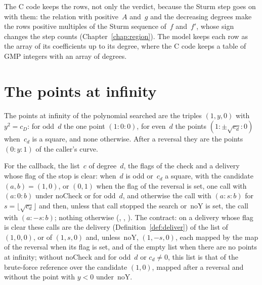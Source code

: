 The C code keeps the rows, not only the verdict, because the Sturm step goes on with them: the
relation with positive~$A$ and~$g$ and the decreasing degrees make the rows positive multiples of
the Sturm sequence of~$f$ and~$f'$, whose sign changes the step counts (Chapter~\ref{chap:region}).
The model keeps each row as the array of its coefficients up to its degree, where the C code keeps a
table of GMP integers with an array of degrees.

\section{The points at infinity}\label{sec:pointsAtInfinity}

The points at infinity of the polynomial searched are the triples $(1, y, 0)$ with $y^2 = c_D$: for
odd~$d$ the one point $(1 : 0 : 0)$, for even~$d$ the points $(1 : \pm\sqrt{c_d} : 0)$ when~$c_d$ is
a square, and none otherwise. After a reversal they are the points $(0 : y : 1)$ of the caller's
curve.

\begin{definition}\label{def:pointsAtInfinity}
  \leanok
  For the callback, the list~$c$ of degree~$d$, the flags of the check and a delivery whose flag of
  the stop is clear: when~$d$ is odd or~$c_d$ a square, with the candidate $(a, b) = (1, 0)$, or
  $(0, 1)$ when the flag of the reversal is set, one call with $(a : 0 : b)$ under
  $\mathrm{noCheck}$ or for odd~$d$, and otherwise the call with $(a : s : b)$ for
  $s = \lfloor \sqrt{c_d} \rfloor$ and then, unless that call stopped the search or~$\mathrm{noY}$
  is set, the call with $(a : -s : b)$; nothing otherwise (,
  , ). The contract: on a
  delivery whose flag is clear these calls are the delivery (Definition~\ref{def:deliver}) of the
  list of $(1, 0, 0)$, or of $(1, s, 0)$ and, unless~$\mathrm{noY}$, $(1, -s, 0)$, each mapped by
  the map of the reversal when its flag is set, and of the empty list when there are no points at
  infinity; without $\mathrm{noCheck}$ and for odd~$d$ or $c_d \ne 0$, this list is that of the
  brute-force reference over the candidate $(1, 0)$, mapped after a reversal and without the point
  with $y < 0$ under~$\mathrm{noY}$.
\end{definition}

